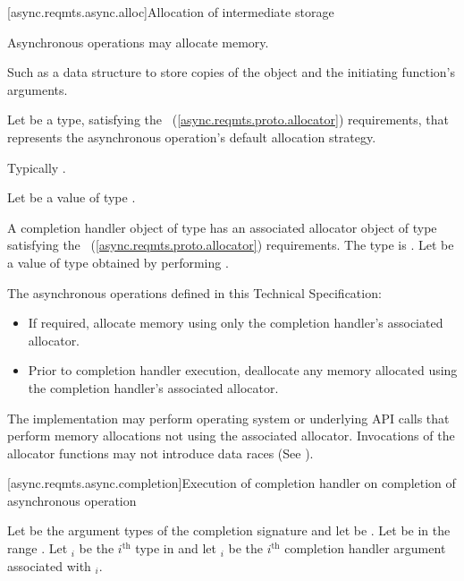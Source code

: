 [async.reqmts.async.alloc]{Allocation of intermediate storage}

\pnum
Asynchronous operations may allocate memory. \begin{note} Such as a data structure to store copies of the  object and the initiating function's arguments. \end{note}

\pnum
Let  be a type, satisfying the ~(\ref{async.reqmts.proto.allocator}) requirements, that represents the asynchronous operation's default allocation strategy. \begin{note} Typically . \end{note} Let  be a value of type .

\pnum
A completion handler object of type  has an associated allocator object  of type  satisfying the ~(\ref{async.reqmts.proto.allocator}) requirements. The type  is . Let  be a value of type  obtained by performing .

\pnum
 The asynchronous operations defined in this Technical Specification:

\begin{itemize}
\item
If required, allocate memory using only the completion handler's associated allocator.

\item
Prior to completion handler execution, deallocate any memory allocated using the completion handler's associated allocator.
\end{itemize}

\pnum
 \begin{note} The implementation may perform operating system or underlying API calls that perform memory allocations not using the associated allocator. Invocations of the allocator functions may not introduce data races (See ). \end{note}



[async.reqmts.async.completion]{Execution of completion handler on completion of asynchronous operation}

\pnum
Let  be the argument types of the completion signature  and let  be . Let  be in the range . Let $_i$ be the $i^\text{th}$ type in  and let $_i$ be the $i^\text{th}$ completion handler argument associated with $_i$.

